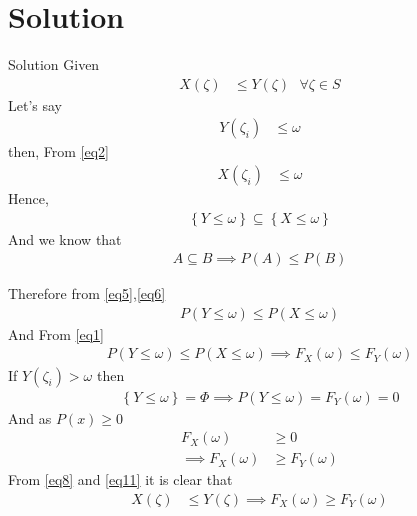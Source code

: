\documentclass{beamer}
\providecommand{\cbrak}[1]{\ensuremath{\left\{#1\right\}}}
\begin{document}
\section{Solution}
\begin{frame}{Solution}
Given
\begin{align}
    X(\zeta)&\leq Y(\zeta) \text{    }\forall \zeta \in S
    \label{eq2}
\end{align}
Let's say 
\begin{align}
    Y(\zeta_i)&\leq \omega 
\end{align}
then, From \eqref{eq2}
\begin{align}
    X(\zeta_i)&\leq \omega 
\end{align}
Hence,\\
\begin{align}
    \cbrak {Y \leq \omega } \subseteq \cbrak{X\leq \omega}
    \label{eq5}
\end{align}
And we know that 
\begin{align}
    A \subseteq B \implies P(A) \leq P(B) \label{eq6}
\end{align}
\end{frame}
\begin{frame}{}
Therefore from \eqref{eq5},\eqref{eq6}
\begin{align}
    P(Y \leq \omega) \leq P(X \leq \omega)
\end{align}
And From \eqref{eq1}
\begin{align}
    P(Y \leq \omega) \leq P(X \leq \omega) \implies F_X(\omega) \leq F_Y(\omega)
    \label{eq8}
\end{align}
If $Y(\zeta_i) > \omega$  then
\begin{align}
    \cbrak{Y \leq \omega} = \Phi
    \implies P(Y \leq \omega) = F_Y(\omega)=0
\end{align}
And as $P(x)\ge 0$
\begin{align}
    F_X(\omega) &\ge 0\\
    \implies F_X(\omega) &\ge F_Y(\omega) \label{eq11}
\end{align}
From \eqref{eq8} and \eqref{eq11} it is clear that
\begin{align}
    X(\zeta)&\leq Y(\zeta) \implies F_X(\omega) \ge F_Y(\omega)
\end{align}
\end{frame}
\end{document}
